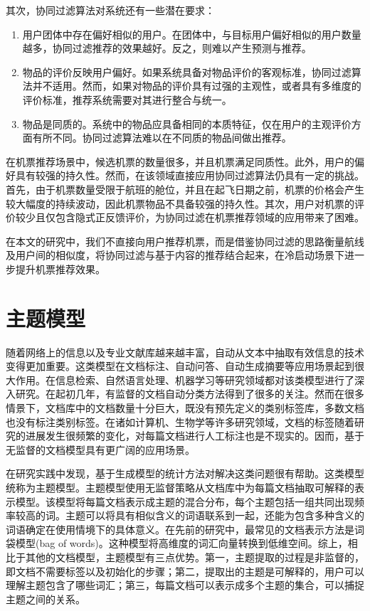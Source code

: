 其次，协同过滤算法对系统还有一些潜在要求：

\begin{enumerate}
	\item 用户团体中存在偏好相似的用户。在团体中，与目标用户偏好相似的用户数量越多，协同过滤推荐的效果越好。反之，则难以产生预测与推荐。
	\item 物品的评价反映用户偏好。如果系统具备对物品评价的客观标准，协同过滤算法并不适用。然而，如果对物品的评价具有过强的主观性，或者具有多维度的评价标准，推荐系统需要对其进行整合与统一。
	\item 物品是同质的。系统中的物品应具备相同的本质特征，仅在用户的主观评价方面有所不同。协同过滤算法难以在不同质的物品间做出推荐。
\end{enumerate}

在机票推荐场景中，候选机票的数量很多，并且机票满足同质性。此外，用户的偏好具有较强的持久性。然而，在该领域直接应用协同过滤算法仍具有一定的挑战。首先，由于机票数量受限于航班的舱位，并且在起飞日期之前，机票的价格会产生较大幅度的持续波动，因此机票物品不具备较强的持久性。其次，用户对机票的评价较少且仅包含隐式正反馈评价，为协同过滤在机票推荐领域的应用带来了困难。

在本文的研究中，我们不直接向用户推荐机票，而是借鉴协同过滤的思路衡量航线及用户间的相似度，将协同过滤与基于内容的推荐结合起来，在冷启动场景下进一步提升机票推荐效果。

\section{主题模型}

随着网络上的信息以及专业文献库越来越丰富，自动从文本中抽取有效信息的技术变得更加重要。这类模型在文档标注、自动问答、自动生成摘要等应用场景起到很大作用。在信息检索、自然语言处理、机器学习等研究领域都对该类模型进行了深入研究。在起初几年，有监督的文档自动分类方法得到了很多的关注\cite{yang1999evaluation}。然而在很多情景下，文档库中的文档数量十分巨大，既没有预先定义的类别标签库，多数文档也没有标注类别标签。在诸如计算机、生物学等许多研究领域，文档的标签随着研究的进展发生很频繁的变化，对每篇文档进行人工标注也是不现实的。因而，基于无监督的文档模型具有更广阔的应用场景。

在研究实践中发现，基于生成模型\cite{zhong2005generative,hofmann1999probabilistic,blei2003latent,minka2002expectation}的统计方法对解决这类问题很有帮助。这类模型统称为主题模型。主题模型使用无监督策略从文档库中为每篇文档抽取可解释的表示模型。该模型将每篇文档表示成主题的混合分布，每个主题包括一组共同出现频率较高的词。主题可以将具有相似含义的词语联系到一起，还能为包含多种含义的词语确定在使用情境下的具体意义。在先前的研究中，最常见的文档表示方法是词袋模型(bag of words)\cite{zhang2010understanding}。这种模型将高维度的词汇向量转换到低维空间。综上，相比于其他的文档模型，主题模型有三点优势。第一，主题提取的过程是非监督的，即文档不需要标签以及初始化的步骤；第二，提取出的主题是可解释的，用户可以理解主题包含了哪些词汇；第三，每篇文档可以表示成多个主题的集合，可以捕捉主题之间的关系。


